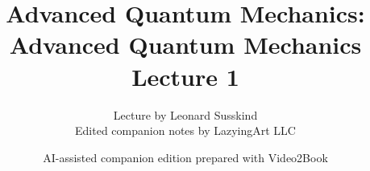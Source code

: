 \documentclass[11pt,oneside]{book}
\begin{document}
\frontmatter
\title{Advanced Quantum Mechanics: Advanced Quantum Mechanics Lecture 1}
\author{Lecture by Leonard Susskind\\Edited companion notes by LazyingArt LLC}
\date{AI-assisted companion edition prepared with Video2Book}
\maketitle
\clearpage
\mainmatter

\end{document}
